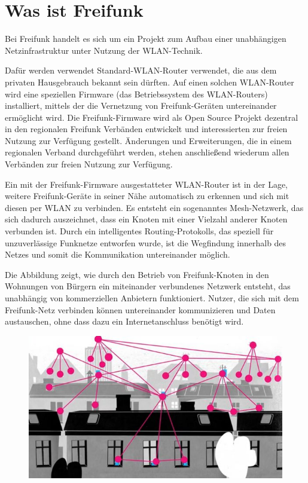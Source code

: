 \documentclass[ngerman]{article}
\begin{document}
\section*{Was ist Freifunk}
Bei Freifunk handelt es sich um ein Projekt zum Aufbau einer unabhängigen Netzinfrastruktur unter Nutzung der WLAN-Technik.

Dafür werden verwendet Standard-WLAN-Router verwendet, die aus dem privaten Hausgebrauch bekannt sein dürften. 
Auf einen solchen WLAN-Router wird eine speziellen Firmware (das Betriebssystem des WLAN-Routers) installiert, mittels der die Vernetzung von Freifunk-Geräten untereinander ermöglicht wird.
Die Freifunk-Firmware wird als Open Source Projekt dezentral in den regionalen Freifunk Verbänden entwickelt und interessierten zur freien Nutzung zur Verfügung gestellt.
Änderungen und Erweiterungen, die in einem regionalen Verband durchgeführt werden, stehen anschließend wiederum allen Verbänden zur freien Nutzung zur Verfügung.
   
Ein mit der Freifunk-Firmware ausgestatteter WLAN-Router ist in der Lage, weitere Freifunk-Geräte in seiner Nähe automatisch zu erkennen und sich mit diesen per WLAN zu verbinden. 
Es entsteht ein sogenanntes Mesh-Netzwerk, das sich dadurch auszeichnet, dass ein Knoten mit einer Vielzahl anderer Knoten verbunden ist.
Durch ein intelligentes Routing-Protokolls, das speziell für unzuverlässige Funknetze entworfen wurde, ist die Wegfindung innerhalb des Netzes und somit die Kommunikation untereinander möglich.

Die Abbildung zeigt, wie durch den Betrieb von Freifunk-Knoten in den Wohnungen von Bürgern ein miteinander verbundenes Netzwerk entsteht, das unabhängig von kommerziellen Anbietern funktioniert. Nutzer, die sich mit dem Freifunk-Netz verbinden können untereinander kommunizieren und Daten austauschen, ohne dass dazu ein Internetanschluss benötigt wird.


\begin{figure}[h!]
	\centering
	\includegraphics[width=.7\textwidth]{freifunk-mesh}
	\label{fig:freifunkwolke}
\end{figure}
\end{document}
